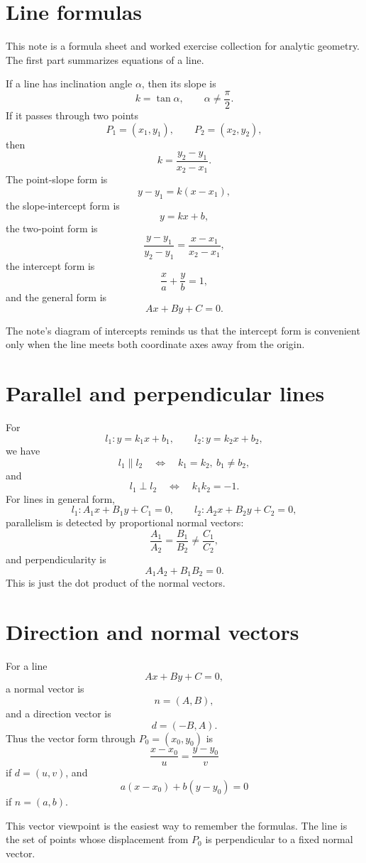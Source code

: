 
\section{Line formulas}

This note is a formula sheet and worked exercise collection for analytic geometry.  The first part summarizes equations of a line.

If a line has inclination angle \(\alpha\), then its slope is
\[
  k=\tan\alpha,\qquad \alpha\neq\frac\pi2.
\]
If it passes through two points
\[
  P_1=(x_1,y_1),\qquad P_2=(x_2,y_2),
\]
then
\[
  k=\frac{y_2-y_1}{x_2-x_1}.
\]
The point-slope form is
\[
  y-y_1=k(x-x_1),
\]
the slope-intercept form is
\[
  y=kx+b,
\]
the two-point form is
\[
  \frac{y-y_1}{y_2-y_1}=\frac{x-x_1}{x_2-x_1},
\]
the intercept form is
\[
  \frac xa+\frac yb=1,
\]
and the general form is
\[
  Ax+By+C=0.
\]

The note's diagram of intercepts reminds us that the intercept form is convenient only when the line meets both coordinate axes away from the origin.

\section{Parallel and perpendicular lines}

For
\[
  l_1:y=k_1x+b_1,\qquad l_2:y=k_2x+b_2,
\]
we have
\[
  l_1\parallel l_2\quad\Longleftrightarrow\quad k_1=k_2,\ b_1\neq b_2,
\]
and
\[
  l_1\perp l_2\quad\Longleftrightarrow\quad k_1k_2=-1.
\]
For lines in general form,
\[
  l_1:A_1x+B_1y+C_1=0,\qquad
  l_2:A_2x+B_2y+C_2=0,
\]
parallelism is detected by proportional normal vectors:
\[
  \frac{A_1}{A_2}=\frac{B_1}{B_2}\neq\frac{C_1}{C_2},
\]
and perpendicularity is
\[
  A_1A_2+B_1B_2=0.
\]
This is just the dot product of the normal vectors.

\section{Direction and normal vectors}

For a line
\[
  Ax+By+C=0,
\]
a normal vector is
\[
  n=(A,B),
\]
and a direction vector is
\[
  d=(-B,A).
\]
Thus the vector form through \(P_0=(x_0,y_0)\) is
\[
  \frac{x-x_0}{u}=\frac{y-y_0}{v}
\]
if \(d=(u,v)\), and
\[
  a(x-x_0)+b(y-y_0)=0
\]
if \(n=(a,b)\).

This vector viewpoint is the easiest way to remember the formulas.  The line is the set of points whose displacement from \(P_0\) is perpendicular to a fixed normal vector.

